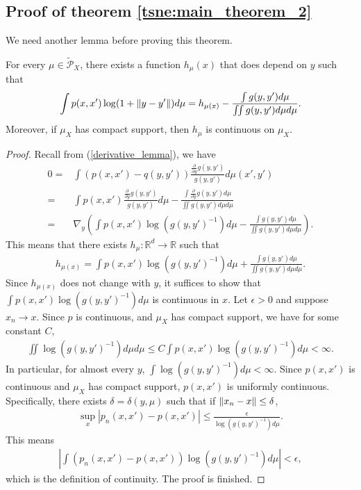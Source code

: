 \subsection{Proof of theorem \ref{tsne:main_theorem_2}}
We need another lemma before proving this theorem.
\begin{lemma} \label{home_stretch_lemma}
    For every $\mu \in \tilde{\mathcal{P}}_X$, there exists a function $h_{\mu}(x)$ that does depend on $y$ such that
    \begin{align}
        \int p(x,x') \log(1+\left\lVert y-y'\right\rVert)d\mu = h_{\mu(x)} - \frac{\int g(y,y')d\mu}{\iint g(y,y')d\mu d\mu}.
    \end{align}
    Moreover, if $\mu_X$ has compact support, then $h_{\mu}$ is continuous on $\mu_X$.
\end{lemma}
\begin{proof}
    Recall from (\ref{derivative_lemma}), we have
    \begin{align}
        0 = & \int (p(x,x')-q(y,y')) \frac{\frac{\partial}{\partial y}g(y,y')}{g(y,y')} d\mu(x',y') \nonumber                                                               \\
        =   & \int p(x,x') \frac{\frac{\partial}{\partial y}g(y,y')}{g(y,y')} d \mu -  \frac{\int \frac{\partial}{\partial y}g(y,y')d\mu}{\iint g(y,y')d\mu d\mu} \nonumber \\
        =   & \nabla_y \left(\int p(x,x') \log (g(y,y')^{-1}) d \mu -  \frac{\int g(y,y')d\mu}{\iint g(y,y')d\mu d\mu}\right).
    \end{align}
    This means that there exists $h_{\mu}: \mathbb{R}^d \to \mathbb{R}$ such that
    \begin{align}
        h_{\mu(x)} = \int p(x,x') \log(g(y,y')^{-1})d\mu + \frac{\int g(y,y')d\mu}{\iint g(y,y')d\mu d\mu}.
    \end{align}
    Since $h_{\mu(x)}$ does not change with $y$, it suffices to show that $\int p(x,x') \log(g(y,y')^{-1})d\mu$ is continuous in $x$. Let $\epsilon>0$ and suppose $x_n \to x$. Since $p$ is continuous, and $\mu_X$ has compact support, we have for some constant $C$,
    \begin{align}
        \iint \log(g(y,y')^{-1})d\mu d\mu \leq C \int p(x,x') \log(g(y,y')^{-1})d\mu < \infty.
    \end{align}
    In particular, for almost every $y$, $\int \log(g(y,y')^{-1})d\mu < \infty$. Since $p(x,x')$ is continuous and $\mu_X$ has compact support, $p(x,x')$ is uniformly continuous. Specifically, there exists $\delta = \delta(y,\mu)$ such that if $\left\lVert x_n-x\right\rVert \leq \delta$,
    \begin{align}
        \sup_x |p_n(x,x')-p(x,x')| \leq \frac{\epsilon}{\log(g(y,y')^{-1})d\mu}.
    \end{align}
    This means
    \begin{align}
        \left|\int(p_n(x,x')-p(x,x')) \log(g(y,y')^{-1})d \mu\right| < \epsilon,
    \end{align}
    which is the definition of continuity. The proof is finished.
\end{proof}
